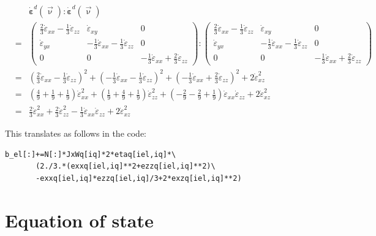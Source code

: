 \documentclass[a4paper,12pt]{article}
\newcommand{\nn}{\nonumber}
\begin{document}
\begin{eqnarray}
&&\dot{\bm \varepsilon}^d(\vec\upnu) : \dot{\bm \varepsilon}^d(\vec\upnu) \nn\\
&=& 
\left(
\begin{array}{ccc}
\frac{2}{3}\dot{\varepsilon}_{xx} -\frac{1}{3}\dot{\varepsilon}_{zz} & \dot{\varepsilon}_{xy} & 0 \\
\dot{\varepsilon}_{yx} & -\frac{1}{3} \dot{\varepsilon}_{xx} -\frac{1}{3}\dot{\varepsilon}_{zz} & 0 \\
0 & 0 & -\frac{1}{3}\dot{\varepsilon}_{xx} +\frac{2}{3} \dot{\varepsilon}_{zz} 
\end{array}
\right)
:
\left(
\begin{array}{ccc}
\frac{2}{3}\dot{\varepsilon}_{xx} -\frac{1}{3}\dot{\varepsilon}_{zz} & \dot{\varepsilon}_{xy} & 0 \\
\dot{\varepsilon}_{yx} & -\frac{1}{3} \dot{\varepsilon}_{xx} -\frac{1}{3}\dot{\varepsilon}_{zz} & 0 \\
0 & 0 & -\frac{1}{3}\dot{\varepsilon}_{xx} +\frac{2}{3} \dot{\varepsilon}_{zz} 
\end{array}
\right) \nn\\
&=&
\left(\frac{2}{3}\dot{\varepsilon}_{xx} -\frac{1}{3}\dot{\varepsilon}_{zz} \right)^2 
+ 
\left(-\frac{1}{3} \dot{\varepsilon}_{xx} -\frac{1}{3}\dot{\varepsilon}_{zz} \right)^2 
+ 
\left(-\frac{1}{3}\dot{\varepsilon}_{xx} +\frac{2}{3} \dot{\varepsilon}_{zz} \right)^2 
+ 2  \dot{\varepsilon}_{xz}^2 
\nn\\
&=& (\frac49 +\frac19 +\frac19) \dot{\varepsilon}_{xx}^2 + 
(\frac19 + \frac49 + \frac19 )\dot{\varepsilon}_{zz}^2 
+(-\frac29 -\frac29 +\frac19) \dot{\varepsilon}_{xx} \dot{\varepsilon}_{zz} 
+ 2  \dot{\varepsilon}_{xz}^2 \nn\\
&=&  \frac23  \dot{\varepsilon}_{xx}^2 + 
\frac23 \dot{\varepsilon}_{zz}^2 
-\frac13  \dot{\varepsilon}_{xx} \dot{\varepsilon}_{zz} 
+ 2  \dot{\varepsilon}_{xz}^2 
\end{eqnarray}

This translates as follows in the code:
\begin{lstlisting}
b_el[:]+=N[:]*JxWq[iq]*2*etaq[iel,iq]*\
       (2./3.*(exxq[iel,iq]**2+ezzq[iel,iq]**2)\
       -exxq[iel,iq]*ezzq[iel,iq]/3+2*exzq[iel,iq]**2)
\end{lstlisting}

\newpage
\section{Equation of state}
\end{document}
